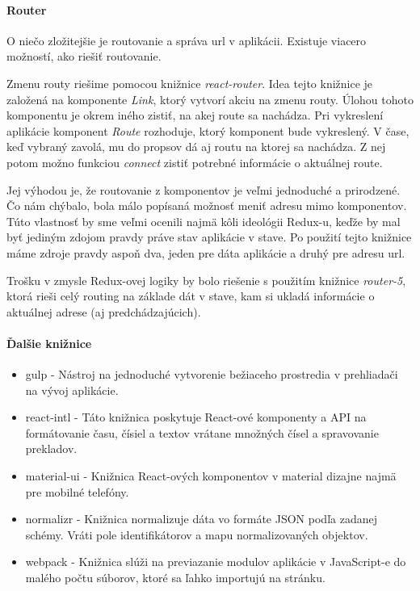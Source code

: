 \TODO{}

\paragraph{Router}%
\NEW{}
O niečo zložitejšie je routovanie a správa url v aplikácii. Existuje viacero možností, ako riešiť routovanie. 

Zmenu routy riešime pomocou knižnice \emph{react-router}. %
Idea tejto knižnice je založená na komponente \emph{Link}, ktorý vytvorí akciu na zmenu routy. Úlohou tohoto komponentu je okrem iného zistiť, na akej route sa nachádza. 
Pri vykreslení aplikácie komponent \emph{Route} rozhoduje, ktorý komponent bude vykreslený. %
V čase, keď vybraný zavolá, mu do propsov %
dá aj routu na ktorej sa nachádza. Z nej potom možno funkciou \emph{connect} zistiť potrebné informácie o aktuálnej route. %

Jej výhodou je, že routovanie z komponentov je veľmi jednoduché a prirodzené. Čo nám chýbalo, bola málo popísaná možnosť meniť adresu mimo komponentov. Túto vlastnosť by sme veľmi ocenili najmä kôli ideológii Redux-u, keďže by mal byť jediným zdojom pravdy práve stav aplikácie v stave. Po použití tejto knižnice máme zdroje pravdy aspoň dva, jeden pre dáta aplikácie a druhý pre adresu url. 


Trošku  v zmysle Redux-ovej logiky by bolo riešenie s použitím knižnice \emph{router-5}, ktorá rieši celý routing na základe dát v stave, kam si ukladá informácie o aktuálnej adrese (aj predchádzajúcich).

\paragraph{Ďalšie knižnice}
\begin{itemize}
  \item gulp \cite{gulp} - Nástroj na jednoduché vytvorenie bežiaceho prostredia v prehliadači na vývoj aplikácie.
  \item react-intl \cite{intl} - Táto knižnica poskytuje React-ové komponenty a API na formátovanie času, čísiel a textov vrátane množných čísel a spravovanie prekladov.
  \item material-ui \cite{material-ui} - Knižnica React-ových komponentov v material dizajne najmä pre mobilné telefóny. %
  \item normalizr \cite{normalizr} - Knižnica normalizuje dáta vo formáte JSON podľa zadanej schémy. Vráti pole identifikátorov a mapu normalizovaných objektov.
  \item webpack \cite{webpack} - Knižnica slúži na previazanie modulov aplikácie v JavaScript-e do malého počtu súborov, ktoré sa ľahko importujú na stránku.
\end{itemize}
